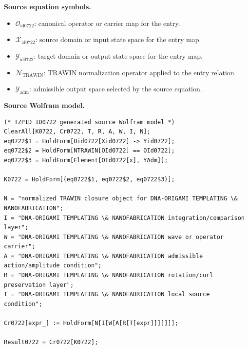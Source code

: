 \begin{minipage}[t]{0.49\linewidth}
\begingroup
\small
\raggedright
\textbf{Source equation symbols.}\par
\begin{itemize}[leftmargin=1.35em,itemsep=1pt,topsep=1pt,parsep=0pt]
    \item $\mathcal{O}_{\mathrm{id0722}}$: canonical operator or carrier map for the entry.
    \item $\mathcal{X}_{\mathrm{id0722}}$: source domain or input state space for the entry map.
    \item $\mathcal{Y}_{\mathrm{id0722}}$: target domain or output state space for the entry map.
    \item $\mathcal{N}_{\mathrm{TRAWIN}}$: TRAWIN normalization operator applied to the entry relation.
    \item $\mathcal{Y}_{\mathrm{adm}}$: admissible output space selected by the source equation.
\end{itemize}
\endgroup
\end{minipage}\hfill
\begin{minipage}[t]{0.47\linewidth}
\begingroup
\scriptsize
\raggedright
\textbf{Source Wolfram model.}\par
\begin{Verbatim}[fontsize=\tiny,breaklines=true,breakanywhere=true]
(* TZPID ID0722 generated source Wolfram model *)
ClearAll[K0722, Cr0722, T, R, A, W, I, N];
eq0722$1 = HoldForm[Oid0722[Xid0722] -> Yid0722];
eq0722$2 = HoldForm[NTRAWIN[OId0722] == OId0722];
eq0722$3 = HoldForm[Element[OId0722[x], YAdm]];

K0722 = HoldForm[{eq0722$1, eq0722$2, eq0722$3}];

N = "normalized TRAWIN closure object for DNA-ORIGAMI TEMPLATING \& NANOFABRICATION";
I = "DNA-ORIGAMI TEMPLATING \& NANOFABRICATION integration/comparison layer";
W = "DNA-ORIGAMI TEMPLATING \& NANOFABRICATION wave or operator carrier";
A = "DNA-ORIGAMI TEMPLATING \& NANOFABRICATION admissible action/amplitude condition";
R = "DNA-ORIGAMI TEMPLATING \& NANOFABRICATION rotation/curl preservation layer";
T = "DNA-ORIGAMI TEMPLATING \& NANOFABRICATION local source condition";

Cr0722[expr_] := HoldForm[N[I[W[A[R[T[expr]]]]]]];

Result0722 = Cr0722[K0722];
\end{Verbatim}
\endgroup
\end{minipage}


